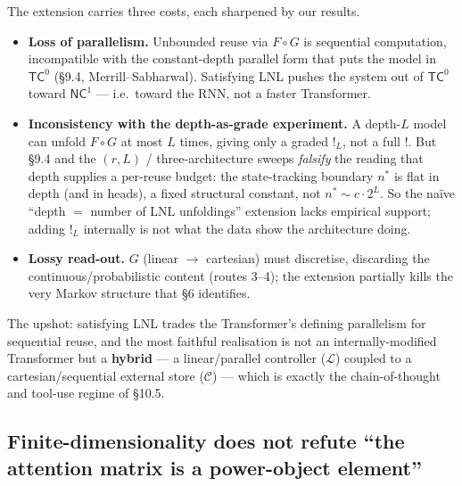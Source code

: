\documentclass[a4paper,11pt]{article}
\begin{document}
The extension carries three costs, each sharpened by our results.

\begin{itemize}
\item
  \textbf{Loss of parallelism.} Unbounded reuse via \(F\circ G\) is
  sequential computation, incompatible with the constant-depth parallel
  form that puts the model in \(\mathsf{TC}^0\) (§9.4,
  Merrill--Sabharwal). Satisfying LNL pushes the system out of
  \(\mathsf{TC}^0\) toward \(\mathsf{NC}^1\) --- i.e.~toward the RNN,
  not a faster Transformer.
\item
  \textbf{Inconsistency with the depth-as-grade experiment.} A
  depth-\(L\) model can unfold \(F\circ G\) at most \(L\) times, giving
  only a graded \(!_L\), not a full \(!\). But §9.4 and the \((r,L)\) /
  three-architecture sweeps \emph{falsify} the reading that depth
  supplies a per-reuse budget: the state-tracking boundary \(n^*\) is
  flat in depth (and in heads), a fixed structural constant, not
  \(n^*\sim c\cdot 2^L\). So the naïve ``depth \(=\) number of LNL
  unfoldings'' extension lacks empirical support; adding \(!_L\)
  internally is not what the data show the architecture doing.
\item
  \textbf{Lossy read-out.} \(G\) (linear \(\to\) cartesian) must discretise, discarding the continuous/probabilistic content (routes 3--4); the extension partially kills the very Markov structure that §6
  identifies.
\end{itemize}

The upshot: satisfying LNL trades the Transformer's defining parallelism
for sequential reuse, and the most faithful realisation is not an
internally-modified Transformer but a \textbf{hybrid} --- a
linear/parallel controller (\(\mathcal{L}\)) coupled to a
cartesian/sequential external store (\(\mathcal{C}\)) --- which is
exactly the chain-of-thought and tool-use regime of §10.5.

\hypertarget{finite-dimensionality-does-not-refute-the-attention-matrix-is-a-power-object-element}{%
\subsection{Finite-dimensionality does not refute ``the attention matrix is a power-object element''}\label{finite-dimensionality-does-not-refute-the-attention-matrix-is-a-power-object-element}}
\end{document}
